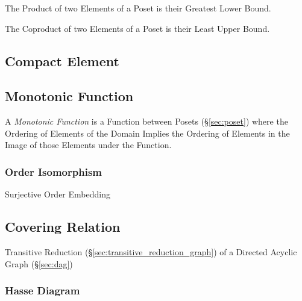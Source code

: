 The Product of two Elements of a Poset is their Greatest Lower Bound.

The Coproduct of two Elements of a Poset is their Least Upper Bound.



\subsection{Compact Element}\label{sec:compact_element}

\subsection{Monotonic Function}\label{sec:monotonic_function}

A \emph{Monotonic Function} is a Function between Posets
(\S\ref{sec:poset}) where the Ordering of Elements of the Domain
Implies the Ordering of Elements in the Image of those Elements under
the Function.



\subsubsection{Order Isomorphism}\label{sec:order_isomorphism}

Surjective Order Embedding



\subsection{Covering Relation}\label{sec:covering_relation}

Transitive Reduction (\S\ref{sec:transitive_reduction_graph}) of a
Directed Acyclic Graph (\S\ref{sec:dag})



\subsubsection{Hasse Diagram}\label{sec:hasse_diagram}



